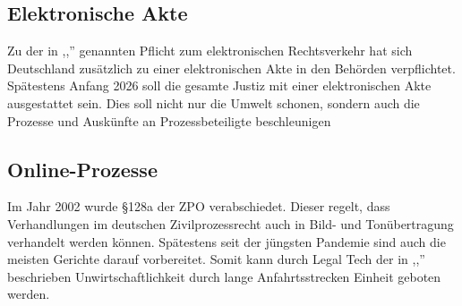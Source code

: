 \subsection{Elektronische Akte}
Zu der in ,,'' genannten Pflicht zum elektronischen Rechtsverkehr hat sich Deutschland zusätzlich zu einer  elektronischen Akte in den Behörden verpflichtet. Spätestens Anfang 2026 soll die gesamte Justiz mit einer elektronischen Akte ausgestattet sein. Dies soll nicht nur die Umwelt schonen, sondern auch die Prozesse und Auskünfte an Prozessbeteiligte beschleunigen 

\subsection{Online-Prozesse}
Im Jahr 2002 wurde §128a der ZPO verabschiedet. Dieser regelt, dass Verhandlungen im deutschen Zivilprozessrecht auch in Bild- und Tonübertragung verhandelt werden können. Spätestens seit der jüngsten Pandemie sind auch die meisten Gerichte darauf vorbereitet.  Somit kann durch Legal Tech der in ,,'' beschrieben Unwirtschaftlichkeit durch lange Anfahrtsstrecken Einheit geboten werden.

